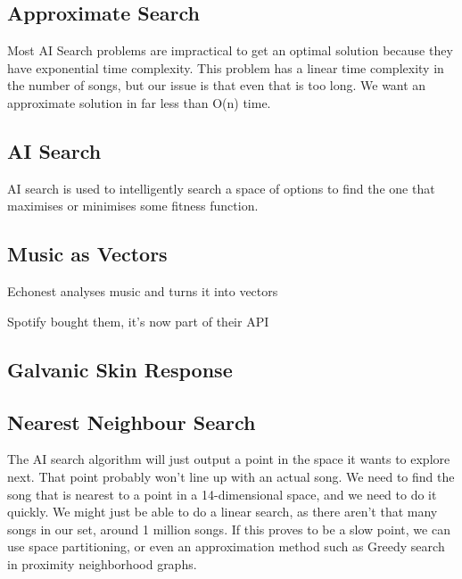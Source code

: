 \documentclass{article}
\begin{document}
	\subsection{Approximate Search}
	Most AI Search problems are impractical to get an optimal solution because they have exponential time complexity. This problem has a linear time complexity in the number of songs, but our issue is that even that is too long. We want an approximate solution in far less than O(n) time.
	
	\subsection{AI Search}
	AI search is used to intelligently search a space of options to find the one that maximises or minimises some fitness function. 
	
	\subsection{Music as Vectors}
	Echonest analyses music and turns it into vectors
	
	Spotify bought them, it's now part of their API
	
	\subsection{Galvanic Skin Response}
	
	
	\subsection{Nearest Neighbour Search}
	The AI search algorithm will just output a point in the space it wants to explore next. That point probably won't line up with an actual song. We need to find the song that is nearest to a point in a 14-dimensional space, and we need to do it quickly. We might just be able to do a linear search, as there aren't that many songs in our set, around 1 million songs. If this proves to be a slow point, we can use space partitioning, or even an approximation method such as Greedy search in proximity neighborhood graphs.
	
\end{document}

